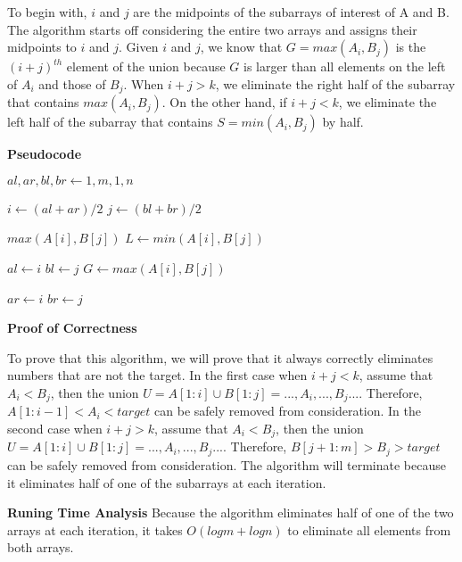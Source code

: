 \documentclass[12pt,article]{article}
\begin{document}
To begin with, $i$ and $j$ are the midpoints of the subarrays of interest of A and B. The algorithm starts off considering the entire two arrays and assigns their midpoints to $i$ and $j$. Given $i$ and $j$, we know that $G = max(A_i,B_j)$ is the $(i+j)^{th}$ element of the union because $G$ is larger than all elements on the left of $A_i$ and those of $B_j$. When $i + j > k$, we eliminate the right half of the subarray that contains $max(A_i,B_j)$. On the other hand, if $i+j < k$, we eliminate the left half of the subarray that contains $S = min(A_i,B_j)$ by half. 

\textbf{Pseudocode}

\begin{algorithm}
\caption{$FK(A[1:m],B[1:n]),k$}\label{alg:q3}
\begin{algorithmic}
    \State $al, ar, bl, br \gets 1,m,1,n$
    
        \State $i \gets (al + ar) / 2$
        \State $j \gets (bl + br) / 2$

            \Return $max(A[i],B[j])$
            \State $L \gets min(A[i],B[j])$

                \State $al \gets i$
            \Else
                \State $bl \gets j$
            \EndIf
        \Else
            \State $G \gets max(A[i],B[j])$

                \State $ar \gets i$
            \Else
                \State $br \gets j$
            \EndIf
        \EndIf
    \EndWhile
\end{algorithmic}
\end{algorithm}

\textbf{Proof of Correctness}

To prove that this algorithm, we will prove that it always correctly eliminates numbers that are not the target. In the first case when $i + j < k$, assume that $A_i < B_j$, then the union $U = A[1:i] \cup B[1:j] = ...,A_i,...,B_j...$. Therefore, $A[1:i-1] < A_i < target$ can be safely removed from consideration. In the second case when $i + j > k$, assume that $A_i < B_j$, then the union $U = A[1:i] \cup B[1:j] = ...,A_i,...,B_j...$. Therefore, $B[j+1:m] > B_j > target$ can be safely removed from consideration. The algorithm will terminate because it eliminates half of one of the subarrays at each iteration. 

\textbf{Runing Time Analysis}
Because the algorithm eliminates half of one of the two arrays at each iteration, it takes $O(logm + logn)$ to eliminate all elements from both arrays.
\end{document}
